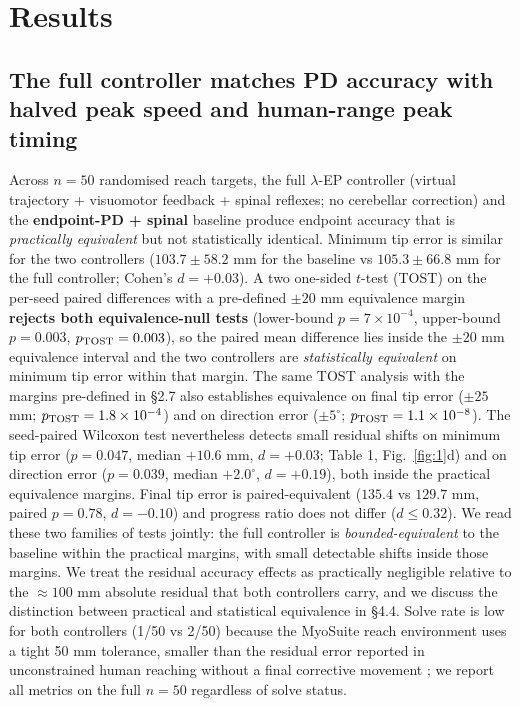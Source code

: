\documentclass[sn-basic]{sn-jnl}
\begin{document}
\section{Results}

\subsection{The full controller matches PD accuracy with halved peak
speed and human-range peak
timing}

Across \(n = 50\) randomised reach targets, the full $\lambda$-EP controller
(virtual trajectory + visuomotor feedback + spinal reflexes; no
cerebellar correction) and the \textbf{endpoint-PD + spinal} baseline
produce endpoint accuracy that is \emph{practically equivalent} but not
statistically identical. Minimum tip error is similar for the two
controllers (\(103.7 \pm 58.2\) mm for the baseline vs
\(105.3 \pm 66.8\) mm for the full controller; Cohen's \(d = +0.03\)). A
two one-sided \(t\)-test (TOST) on the per-seed paired differences with
a pre-defined \(\pm 20\) mm equivalence margin \textbf{rejects both
equivalence-null tests} (lower-bound \(p = 7 \times 10^{-4}\),
upper-bound \(p = 0.003\), \(p_{\rm TOST} = 0.003\)), so the paired mean
difference lies inside the \(\pm 20\) mm equivalence interval and the
two controllers are \emph{statistically equivalent} on minimum tip error
within that margin. The same TOST analysis with the margins pre-defined
in §2.7 also establishes equivalence on final tip error (\(\pm 25\) mm;
\(p_{\rm TOST} = 1.8 \times 10^{-4}\)) and on direction error
($\pm 5^{\circ}$; \(p_{\rm TOST} = 1.1 \times 10^{-8}\)). The seed-paired
Wilcoxon test nevertheless detects small residual shifts on minimum tip
error (\(p = 0.047\), median \(+10.6\) mm, \(d = +0.03\); Table 1, Fig.~\ref{fig:1}d) and on direction error (\(p = 0.039\), median $+2.0^{\circ}$,
\(d = +0.19\)), both inside the practical equivalence margins. Final tip
error is paired-equivalent (\(135.4\) vs \(129.7\) mm, paired
\(p = 0.78\), \(d = -0.10\)) and progress ratio does not differ
(\(d \le 0.32\)). We read these two families of tests jointly: the full
controller is \emph{bounded-equivalent} to the baseline within the
practical margins, with small detectable shifts inside those margins. We
treat the residual accuracy effects as practically negligible relative
to the \(\approx 100\) mm absolute residual that both controllers carry,
and we discuss the distinction between practical and statistical
equivalence in §4.4. Solve rate is low for both controllers (1/50 vs
2/50) because the MyoSuite reach environment uses a tight 50 mm
tolerance, smaller than the residual error reported in unconstrained
human reaching without a final corrective movement \citep{sarlegnasainburg2009}; we report all metrics on the full \(n = 50\) regardless
of solve status.
\end{document}
